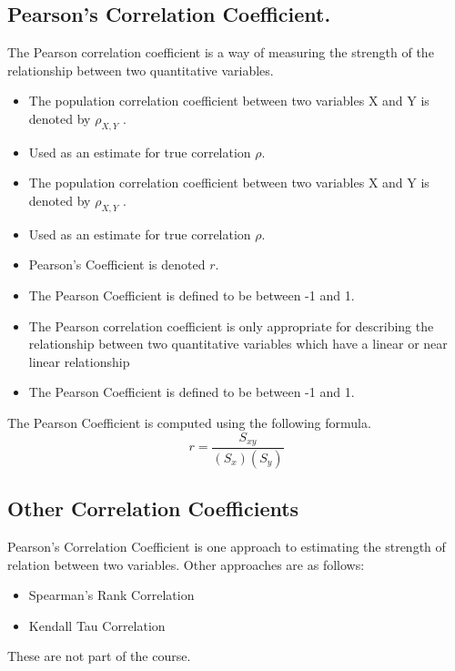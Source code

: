 \documentclass[]{report}
\begin{document}
\begin{framed}
\subsection{Pearson's Correlation Coefficient.}

The Pearson correlation coefficient is a way of measuring the
strength of the relationship between two quantitative variables.

\begin{itemize}
	\item The population correlation coefficient between two variables X and
	Y is denoted by $\rho_{X,Y}$ .
	\item Used as an estimate for true correlation $\rho$.
	\item The population correlation coefficient between two variables X and
	Y is denoted by $\rho_{X,Y}$ .
	\item Used as an estimate for true correlation $\rho$.
	\item Pearson's Coefficient is denoted $r$.
	\item The Pearson Coefficient is defined to be between -1 and 1.
	\item The Pearson correlation coefficient is only appropriate for
	describing the relationship between two quantitative variables
	which have a linear or near linear relationship

	\item The Pearson Coefficient is defined to be between -1 and 1.

\end{itemize}

The Pearson Coefficient is computed using the following formula.
\[ r = \frac{S_{xy}}{(S_x)(S_y)} \]

\end{framed}
\subsection{Other Correlation Coefficients}
Pearson's Correlation Coefficient is one approach to estimating the strength of relation between two variables.
Other approaches are as follows:
\begin{itemize}
	\item Spearman's Rank Correlation
	\item Kendall Tau Correlation
\end{itemize}
These are not part of the course.
\end{document}
